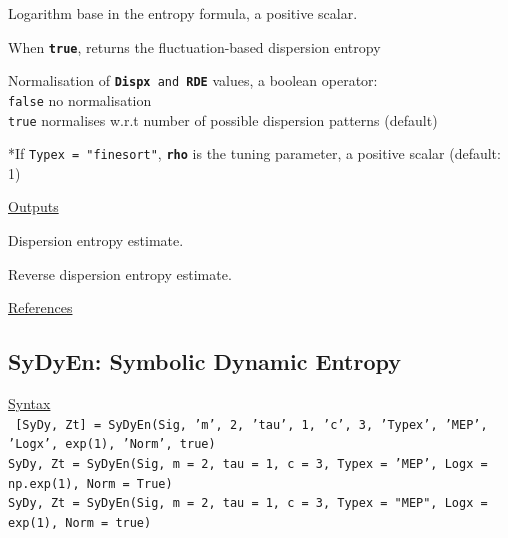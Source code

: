 \documentclass[12pt, a4paper, titlepage, openany]{book}
\begin{document}
\begin{description}[labelsep=1cm, labelwidth=2cm, nosep, style=multiline,leftmargin=3cm]
\begin{description}[labelsep=5em, labelwidth=8em, nosep,style=multiline,leftmargin=3cm]
	\end{description}
\item[\texttt{Logx}]	Logarithm base in the entropy formula, a positive scalar.
\item[\texttt{Fluct}]	When \texttt{\textbf{true}}, returns the fluctuation-based dispersion entropy \cite{Disp2}
\item[\texttt{Norm}]    Normalisation of \texttt{\textbf{Dispx} and \textbf{RDE}} values, a boolean operator:\\
		  \texttt{false} \hspace{10pt} no normalisation \\
		  \texttt{true} \hspace{15pt}  normalises w.r.t number of possible dispersion patterns (default)
\item[\texttt{rho}]		*If \texttt{Typex = "finesort"}, \texttt{\textbf{rho}} is the tuning parameter, a positive scalar (default: 1)
\end{description}

\noindent \ul{Outputs}
\begin{description}[labelsep=1cm, labelwidth=2cm, nosep, style=multiline,leftmargin=3cm]\footnotesize
\item[\texttt{Dispx}]		Dispersion entropy estimate.
\item[\texttt{RDE}]		Reverse dispersion entropy estimate.  \cite{Disp3}
\end{description}

\noindent \ul{References}\hspace{1cm}
\cite{Disp1} \cite{Disp2} \cite{Disp3} \cite{Disp4}



\newpage
\subsection{\normalsize SyDyEn: \hspace{15mm} Symbolic Dynamic Entropy}\label{SyDyEn}
\noindent\ul{Syntax} \vspace{6mm} \\ \noindent \texttt{\footnotesize
[SyDy, Zt] = SyDyEn(Sig, 'm', 2, 'tau', 1, 'c', 3, 'Typex', 'MEP', 'Logx', exp(1), 'Norm', true)\\
SyDy, Zt = SyDyEn(Sig, m = 2, tau = 1, c = 3, Typex = 'MEP', Logx = np.exp(1), Norm = True)\\
SyDy, Zt = SyDyEn(Sig, m = 2, tau = 1, c = 3, Typex = "MEP", Logx = exp(1), Norm = true)}
\end{document}
